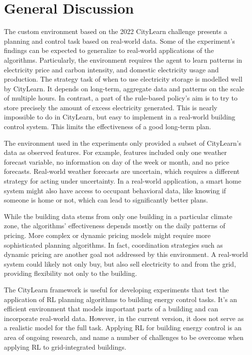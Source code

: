 \section{General Discussion}
The custom environment based on the 2022 CityLearn challenge presents a planning and control task based on real-world data.
Some of the experiment's findings can be expected to generalize to real-world applications of the algorithms.
Particularly, the environment requires the agent to learn patterns in electricity price and carbon intensity, and domestic electricity usage and production.
The strategy task of when to use electricity storage is modelled well by CityLearn.
It depends on long-term, aggregate data and patterns on the scale of multiple hours.
In contrast, a part of the rule-based policy's aim is to try to store precisely the amount of excess electricity generated. This is nearly impossible to do in CityLearn, but easy to implement in a real-world building control system.
This limits the effectiveness of a good long-term plan.

The environment used in the experiments only provided a subset of CityLearn's data as observed features.
For example, features included only one weather forecast variable, no information on day of the week or month, and no price forecasts.
Real-world weather forecasts are uncertain, which requires a different strategy for acting under uncertainty.
In a real-world application, a smart home system might also have access to occupant behavioral data, like knowing if someone is home or not, which can lead to significantly better plans.

While the building data stems from only one building in a particular climate zone, the algorithms' effectiveness depends mostly on the daily patterns of pricing.
More complex or dynamic pricing models might require more sophisticated planning algorithms.
In fact, coordination strategies such as dynamic pricing are another goal not addressed by this environment.
A real-world system could likely not only buy, but also sell electricity to and from the grid, providing flexibility not only to the building.

The CityLearn framework is useful for developing experiments that test the application of RL planning algorithms to building energy control tasks.
It's an efficient environment that models important parts of a building and can incorporate real-world data.
However, in the current version, it does not serve as a realistic model for the full task.
Applying RL for building energy control is an area of ongoing research, and \cite{nweye2022RealworldChallengesMultiagent} name a number of challenges to be overcome when applying RL to grid-integrated buildings.

